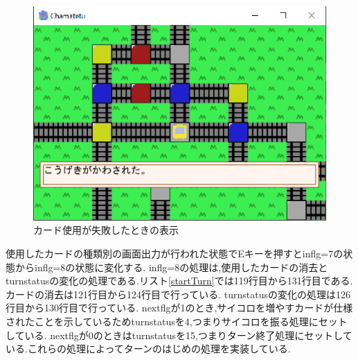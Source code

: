 \documentclass[a4j]{jarticle}
\begin{document}
                \begin{figure}[H]
                \centering
                \includegraphics[scale=1.3]{hirari.eps}
                \caption{カード使用が失敗したときの表示}
                 \label{c9}
                \end{figure}

    使用したカードの種類別の画面出力が行われた状態でEキーを押すとinflg=7の状態からinflg=8の状態に変化する.
    inflg=8の処理は,使用したカードの消去とturnstatusの変化の処理である.リスト\ref{startTurn}では119行目から131行目である.
    カードの消去は121行目から124行目で行っている. turnstatusの変化の処理は126行目から130行目で行っている.
    nextflgが1のとき,サイコロを増やすカードが仕様されたことを示しているためturnstatusを4,つまりサイコロを振る処理にセットしている.
    nextflgが0のときはturnstatusを15,つまりターン終了処理にセットしている.これらの処理によってターンのはじめの処理を実装している.
\end{document}

